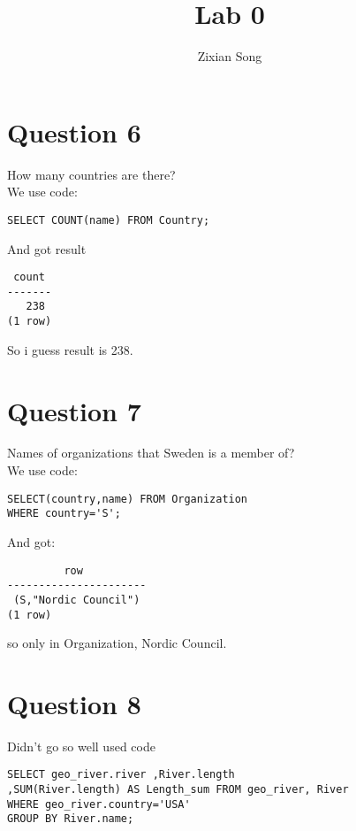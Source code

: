 \documentclass[a4paper]{article}
\title{Lab 0}
\author{Zixian Song}
\begin{document}
\maketitle


\section{Question 6}
How many countries are there?
\\ 
We use code:
\begin{verbatim}
SELECT COUNT(name) FROM Country;
\end{verbatim}
And got result 
\begin{verbatim}
 count
-------
   238
(1 row)
\end{verbatim}
So i guess result is 238.

\section{Question 7}
Names of organizations that Sweden is a member of?
\\
We use code:
\begin{verbatim}
SELECT(country,name) FROM Organization
WHERE country='S';
\end{verbatim}
And got:
\begin{verbatim}
         row
----------------------
 (S,"Nordic Council")
(1 row)
\end{verbatim}
so only in Organization, Nordic Council.

\section{Question 8}
Didn't go so well
used code
\begin{verbatim}
SELECT geo_river.river ,River.length 
,SUM(River.length) AS Length_sum FROM geo_river, River
WHERE geo_river.country='USA'
GROUP BY River.name;
\end{verbatim}
\end{document}

